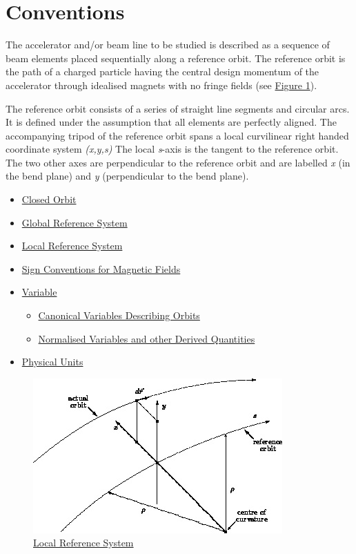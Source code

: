 
\chapter{Conventions}

The accelerator and/or beam line to be studied is described as a
sequence of beam elements placed sequentially along a reference
orbit. The reference orbit is the path of a charged particle having the
central design momentum of the accelerator through idealised magnets
with no fringe fields (see \hyperlink{local}{Figure 1}). 


The reference orbit consists of a series of straight line segments and
circular arcs. It is defined under the assumption that all elements are
perfectly aligned. The accompanying tripod of the reference orbit spans
a local curvilinear right handed coordinate system \textit{(x,y,s)} The
local \textit{s}-axis is the tangent to the reference orbit. The two
other axes are perpendicular to the reference orbit and are labelled
\textit{x} (in the bend plane) and \textit{y} (perpendicular to the bend
plane).  

\begin{itemize}
	\item \href{closed_orbit.html}{Closed Orbit}
	\item \href{global_system.html}{Global Reference System}
	\item \href{local_system.html}{Local Reference System}
	\item \href{sign_convent.html}{Sign Conventions for Magnetic Fields}
	\item \href{tables.html}{Variable}
\begin{itemize}
	\item \href{tables.html#canon}{Canonical Variables Describing Orbits}
	\item \href{tables.html#normal}{Normalised Variables and other Derived Quantities}
\end{itemize}
	\item \href{mad_units.html}{Physical Units}
\end{itemize}

\begin{figure}[h!]
  \centering
	\includegraphics{figures/local_reference.png}
  \caption{\href{local}{Local Reference System}}%
\end{figure}


